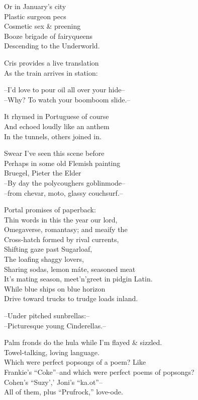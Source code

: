 Or in January's city \\
Plastic surgeon pecs \\
Cosmetic sex \& preening \\
Booze brigade of fairyqueens \\
Descending to the Underworld.

Cris provides a live translation \\
As the train arrives in station:

--I'd love to pour oil all over your hide-- \\
--Why? To watch your boomboom slide.--

It rhymed in Portuguese of course \\
And echoed loudly like an anthem \\
In the tunnels, others joined in. 

Swear I've seen this scene before \\
Perhaps in some old Flemish painting \\
Bruegel, Pieter the Elder \\

--By day the polycoughers goblinmode-- \\
--from chevar, moto, glassy couchsurf.-- 

\secdiv

Portal promises of paperback: \\
Thin words in this the year our lord, \\
Omegaverse, romantasy; and meaify the \\
Cross-hatch formed by rival currents, \\
Shifting gaze past Sugarloaf, \\
The loafing shaggy lovers, \\
Sharing sodas, lemon máte, seasoned meat \\
It's mating season, meet'n'greet in pidgin Latin. \\
While blue ships on blue horizon \\
Drive toward trucks to trudge loads inland.

--Under pitched sunbrellas:-- \\
--Picturesque young Cinderellas.--

Palm fronds do the hula while I'm flayed \& sizzled. \\
Towel-talking, loving language. \\
Which were perfect popsongs of a poem? Like \\
Frankie's ``Coke''--and which were perfect poems of popsongs? \\
Cohen's ``Suzy',' Joni's ``ka{\textsci}.o{\textupsilon}t''-- \\
All of them, plus ``Prufrock,'' love-ode. \\

